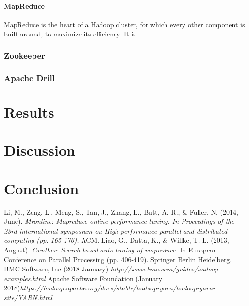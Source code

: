 \documentclass[a4paper,english]{report}
\begin{document}
				\subsubsection{MapReduce}
					MapReduce is the heart of a Hadoop cluster, for which every other component is built around, to maximize its efficiency. It is  
						
			\subsection{Zookeeper}
			\subsection{Apache Drill}
	\chapter{Results}
	\chapter{Discussion}
	\chapter{Conclusion}
	\begin{thebibliography}{1}
		Li, M., Zeng, L., Meng, S., Tan, J., Zhang, L., Butt, A. R., \& Fuller, N. (2014, June). \emph{Mronline: Mapreduce online performance tuning. In Proceedings of the 23rd international symposium on High-performance parallel and distributed computing (pp. 165-176).} ACM.
		Liao, G., Datta, K., \& Willke, T. L. (2013, August). \emph{Gunther: Search-based auto-tuning of mapreduce.} In European Conference on Parallel Processing (pp. 406-419). Springer Berlin Heidelberg.
		BMC Software, Inc (2018 January) \emph{http://www.bmc.com/guides/hadoop-examples.html}
		Apache Software Foundation (January 2018)\emph{https://hadoop.apache.org/docs/stable/hadoop-yarn/hadoop-yarn-site/YARN.html}
	\end{thebibliography}
\end{document}
